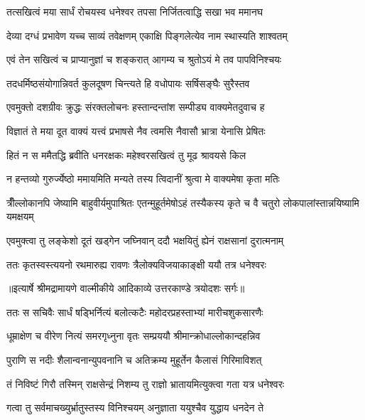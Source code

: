 \twolineshloka
{तत्सखित्वं मया सार्धं रोचयस्व धनेश्वर}
{तपसा निर्जितत्वाद्धि सखा भव ममानघ} %

\twolineshloka
{देव्या दग्धं प्रभावेण यच्च साव्यं तवेक्षणम्}
{एकाक्षि पिङ्गलेत्येव नाम स्थास्यति शाश्वतम्} %

\twolineshloka
{एवं तेन सखित्वं च प्राप्यानुज्ञां च शङ्करात्}
{आगम्य च श्रुतोऽयं मे तव पापविनिश्चयः} %

\twolineshloka
{तदधर्मिष्ठसंयोगान्निवर्त कुलदूषण}
{चिन्त्यते हि वधोपायः सर्षिसङ्घैः सुरैस्तव} %

\twolineshloka
{एवमुक्तो दशग्रीवः क्रुद्धः संरक्तलोचनः}
{हस्तान्दन्तांश सम्पीड्य वाक्यमेतदुवाच ह} %

\twolineshloka
{विज्ञातं ते मया दूत वाक्यं यत्त्वं प्रभाषसे}
{नैव त्वमसि नैवासौ भ्रात्रा येनासि प्रेषितः} %

\twolineshloka
{हितं न स ममैतद्धि ब्रवीति धनरक्षकः}
{महेश्वरसखित्वं तु मूढ श्रावयसे किल} %

\twolineshloka
{न हन्तव्यो गुरुर्ज्येष्ठो ममायमिति मन्यते}
{तस्य त्विदानीं श्रुत्वा मे वाक्यमेषा कृता मतिः} %

\threelineshloka
{त्रीँल्लोकानपि जेष्यामि बाहुवीर्यमुपाश्रितः}
{एतन्मुहूर्तमेषोऽहं तस्यैकस्य कृते च वै}
{चतुरो लोकपालांस्तान्नयिष्यामि यमक्षयम्} %

\twolineshloka
{एवमुक्त्वा तु लङ्केशो दूतं खड्गेन जघ्निवान्}
{ददौ भक्षयितुं ह्येनं राक्षसानां दुरात्मनाम्} %

\twolineshloka
{ततः कृतस्वस्त्ययनो रथमारुह्य रावणः}
{त्रैलोक्यविजयाकाङ्क्षी ययौ तत्र धनेश्वरः} %


{॥इत्यार्षे श्रीमद्रामायणे वाल्मीकीये आदिकाव्ये उत्तरकाण्डे त्रयोदशः सर्गः॥}


\twolineshloka
{ततः स सचिवैः सार्धं षड्भिर्नित्यं बलोत्कटैः}
{महोदरप्रहस्ताभ्यां मारीचशुकसारणैः} %

\twolineshloka
{धूम्राक्षेण च वीरेण नित्यं समरगृध्नुना}
{वृतः सम्प्रययौ श्रीमान्क्रोधाल्लोकान्दहन्निव} %

\twolineshloka
{पुराणि स नदीः शैलान्वनान्युपवनानि च}
{अतिक्रम्य मुहूर्तेन कैलासं गिरिमाविशत्} %

\twolineshloka
{तं निविष्टं गिरौ तस्मिन् राक्षसेन्द्रं निशम्य तु}
{राज्ञो भ्रातायमित्युक्त्वा गता यत्र धनेश्वरः} %

\twolineshloka
{गत्वा तु सर्वमाचख्युर्भ्रातुस्तस्य विनिश्चयम्}
{अनुज्ञाता ययुश्चैव युद्धाय धनदेन ते} %

